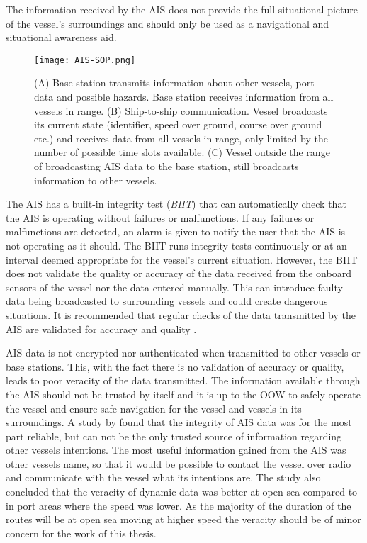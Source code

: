 \documentclass[../main.tex]{subfiles}
\begin{document}
The information received by the AIS does not provide the full situational picture of the vessel's surroundings and should only be used as a navigational and situational awareness aid.

\begin{figure}[H]
\centering
\texttt{[image: AIS-SOP.png]}
\caption{(A) Base station transmits information about other vessels, port data and possible hazards. Base station receives information from all vessels in range. (B) Ship-to-ship communication. Vessel broadcasts its current state (identifier, speed over ground, course over ground etc.) and receives data from all vessels in range, only limited by the number of possible time slots available. (C) Vessel outside the range of broadcasting AIS data to the base station, still broadcasts information to other vessels.}
\label{fig:ais-sop}
\end{figure}

The AIS has a built-in integrity test (\textit{BIIT}) that can automatically check that the AIS is operating without failures or malfunctions. If any failures or malfunctions are detected, an alarm is given to notify the user that the AIS is not operating as it should. The BIIT runs integrity tests continuously or at an interval deemed appropriate for the vessel's current situation. However, the BIIT does not validate the quality or accuracy of the data received from the onboard sensors of the vessel nor the data entered manually. This can introduce faulty data being broadcasted to surrounding vessels and could create dangerous situations. It is recommended that regular checks of the data transmitted by the AIS are validated for accuracy and quality \cite{IMO_2015}.

AIS data is not encrypted nor authenticated when transmitted to other vessels or base stations. This, with the fact there is no validation of accuracy or quality, leads to poor veracity of the data transmitted. The information available through the AIS should not be trusted by itself and it is up to the OOW to safely operate the vessel and ensure safe navigation for the vessel and vessels in its surroundings. A study by \citeauthor{Felski_2013} found that the integrity of AIS data was for the most part reliable, but can not be the only trusted source of information regarding other vessels intentions. The most useful information gained from the AIS was other vessels name, so that it would be possible to contact the vessel over radio and communicate with the vessel what its intentions are. The study also concluded that the veracity of dynamic data was better at open sea compared to in port areas where the speed was lower. As the majority of the duration of the routes will be at open sea moving at higher speed the veracity should be of minor concern for the work of this thesis.
\end{document}
